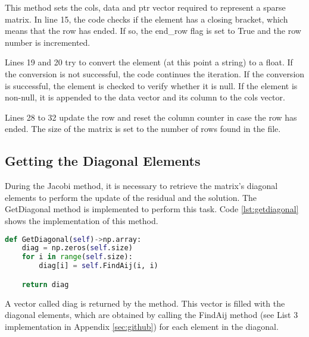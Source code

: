 This method sets the cols, data and ptr vector required to represent a sparse matrix. In line 15, the code checks if the element has a closing bracket, which means that the row has ended. If so, the end\_row flag is set to True and the row number is incremented.  

Lines 19 and 20 try to convert the element (at this point a string) to a float. If the conversion is not successful, the code continues the iteration. If the conversion is successful, the element is checked to verify whether it is null. If the element is non-null, it is appended to the data vector and its column to the cols vector. 

Lines 28 to 32 update the row and reset the column counter in case the row has ended. The size of the matrix is set to the number of rows found in the file. 

\subsection{Getting the Diagonal Elements} \label{sec:diagonal}
During the Jacobi method, it is necessary to retrieve the matrix's diagonal elements to perform the update of the residual and the solution. The GetDiagonal method is implemented to perform this task. Code \ref{lst:getdiagonal} shows the implementation of this method.
\begin{lstlisting}[language=python, caption={GetDiagonal method implementation}, label={lst:getdiagonal}]
def GetDiagonal(self)->np.array:
    diag = np.zeros(self.size)
    for i in range(self.size):
        diag[i] = self.FindAij(i, i)

    return diag
\end{lstlisting}

A vector called diag is returned by the method. This vector is filled with the diagonal elements, which are obtained by calling the FindAij method (see List 3 implementation in Appendix \ref{sec:github}) for each element in the diagonal.

